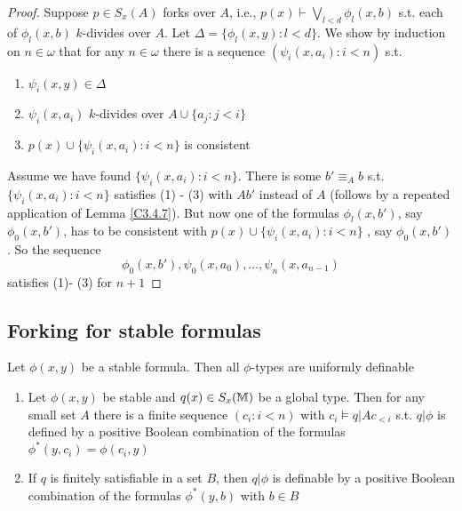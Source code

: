 \documentclass[11pt]{article}
\begin{document}
\begin{proof}
Suppose \(p\in S_x(A)\) forks over \(A\), i.e., \(p(x)\vdash\bigvee_{l<d}\phi_l(x,b)\) s.t. each
of \(\phi_l(x,b)\) \(k\)-divides over \(A\). Let \(\Delta=\{\phi_l(x,y):l<d\}\). We show by induction
on \(n\in\omega\) that for any \(n\in\omega\) there is a sequence \((\psi_i(x,a_i):i<n)\) s.t.
\begin{enumerate}
\item \(\psi_i(x,y)\in\Delta\)
\item \(\psi_i(x,a_i)\) \(k\)-divides over \(A\cup\{a_j:j<i\}\)
\item \(p(x)\cup\{\psi_i(x,a_i):i<n\}\) is consistent
\end{enumerate}


Assume we have found \(\{\psi_i(x,a_i):i<n\}\). There is some \(b'\equiv_Ab\) s.t. \(\{\psi_i(x,a_i):i<n\}\)
satisfies (1) - (3) with \(Ab'\) instead of \(A\) (follows by a repeated application of Lemma
\ref{C3.4.7}). But now one of the formulas \(\phi_l(x,b')\), say \(\phi_0(x,b')\), has to be consistent
with \(p(x)\cup\{\psi_i(x,a_i):i<n\}\) , say \(\phi_0(x,b')\). So the sequence
\begin{equation*}
\phi_0(x,b'),\psi_0(x,a_0),\dots,\psi_n(x,a_{n-1})
\end{equation*}
satisfies (1)- (3) for \(n+1\)
\end{proof}


\subsection{Forking for stable formulas}
\label{sec:org60df5ba}
\begin{fact}[\ref{C2.3.8}]
Let \(\phi(x,y)\) be a stable formula. Then all \(\phi\)-types are uniformly definable
\end{fact}

\begin{proposition}[]
\begin{enumerate}
\item Let \(\phi(x,y)\) be stable and \(q(x)\in S_x(\mathbb{M})\) be a global type. Then for any small set \(A\)
there is a finite sequence \((c_i:i<n)\) with \(c_i\vDash q|Ac_{<i}\) s.t. \(q|\phi\) is defined by a
positive Boolean combination of the formulas \(\phi^*(y,c_i)=\phi(c_i,y)\)
\item If \(q\) is finitely satisfiable in a set \(B\), then \(q|\phi\) is definable by a positive
Boolean combination of the formulas \(\phi^*(y,b)\) with \(b\in B\)
\end{enumerate}
\end{proposition}
\end{document}
